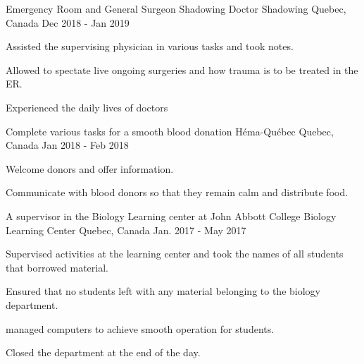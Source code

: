 
\begin{cventries}
\cventry
    {Emergency Room and General Surgeon Shadowing}
    {Doctor Shadowing}
    {Quebec, Canada}
    {Dec 2018 - Jan 2019}
    {
      \begin{cvitems}
        \item {Assisted the supervising physician in various tasks and took notes.}
        \item {Allowed to spectate live ongoing surgeries and how trauma is to be treated in the ER.}
        \item {Experienced the daily lives of doctors}
      \end{cvitems}
    }    \newline

\cventry
    {Complete various tasks for a smooth blood donation}
    {Héma-Québec}
    {Quebec, Canada}
    {Jan 2018 - Feb 2018}
    {
      \begin{cvitems}
        \item {Welcome donors and offer information.}
        \item {Communicate with blood donors so that they remain calm and distribute food.}
      \end{cvitems}
    }    \newline

  \cventry
    {A supervisor in the Biology Learning center at John Abbott College}
    {Biology Learning Center}
    {Quebec, Canada}
    {Jan. 2017 - May 2017}
    {
      \begin{cvitems}
        \item {Supervised activities at the learning center and took the names of all students that borrowed material.}
        \item {Ensured that no students left with any material belonging to the biology department.}
        \item {managed computers to achieve smooth operation for students.}
        \item {Closed the department at the end of the day.}
      \end{cvitems}
    }    \newline

    \end{cventries}
